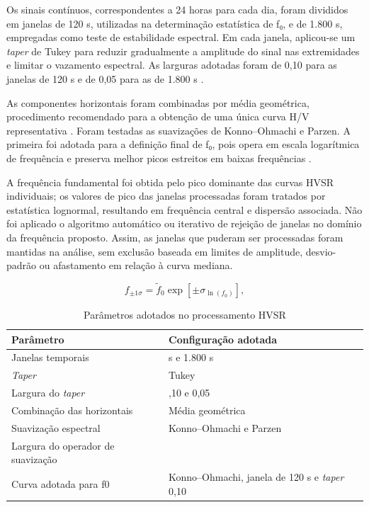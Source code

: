 Os sinais contínuos, correspondentes a 24 horas para cada dia, foram divididos em janelas de 120 s, utilizadas na determinação estatística de f₀, e de 1.800 s, empregadas como teste de estabilidade espectral. Em cada janela, aplicou-se um \textit{taper} de Tukey para reduzir gradualmente a amplitude do sinal nas extremidades e limitar o vazamento espectral. As larguras adotadas foram de 0,10 para as janelas de 120 s e de 0,05 para as de 1.800 s \cite{sesame2004,vantassel2021}.

As componentes horizontais foram combinadas por média geométrica, procedimento recomendado para a obtenção de uma única curva H/V representativa \cite{coxcheng2020}. Foram testadas as suavizações de Konno--Ohmachi e Parzen. A primeira foi adotada para a definição final de f₀, pois opera em escala logarítmica de frequência e preserva melhor picos estreitos em baixas frequências \cite{konno1998,sesame2004}.

A frequência fundamental foi obtida pelo pico dominante das curvas HVSR individuais; os valores de pico das janelas processadas foram tratados por estatística lognormal, resultando em frequência central e dispersão associada. Não foi aplicado o algoritmo automático ou iterativo de rejeição de janelas no domínio da frequência proposto. Assim, as janelas que puderam ser processadas foram mantidas na análise, sem exclusão baseada em limites de amplitude, desvio-padrão ou afastamento em relação à curva mediana.

\begin{equation}
  f_{\pm1\sigma}=\widetilde{f}_0\exp\!\left[\pm\sigma_{\ln(f_0)}\right],
  \label{eq:intervalo-lognormal}
\end{equation}

\begin{table}[htbp]
  \centering
  \caption[Parâmetros adotados no processamento HVSR]{Parâmetros adotados no processamento HVSR}
  \label{tab:resultado-3}
  \small
  \setlength{\tabcolsep}{2.5pt}
  \begin{tabularx}{\textwidth}{>{\raggedright\arraybackslash}X >{\centering\arraybackslash}X}
    \toprule
    \textbf{Parâmetro} & \textbf{Configuração adotada} \\
    \midrule
    Janelas temporais & 120 s e 1.800 s \\
    \textit{Taper} & Tukey \\
    Largura do \textit{taper} & 0,10 e 0,05 \\
    Combinação das horizontais & Média geométrica \\
    Suavização espectral & Konno--Ohmachi e Parzen \\
    Largura do operador de suavização & 40 \\
    Curva adotada para f0 & Konno--Ohmachi, janela de 120 s e \textit{taper} 0,10 \\
    \bottomrule
  \end{tabularx}
\end{table}

